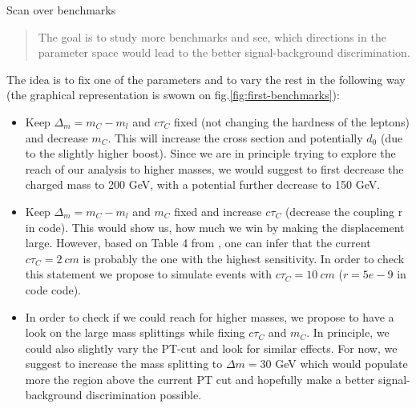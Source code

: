 \documentclass[12pt,letterpaper,notitlepage]{article}
\begin{document}
\begin{center}
\LARGE Scan over benchmarks
\end{center}

\vspace{1.0cm}
\begin{abstract}
\vspace{0.2cm}\noindent
The goal is to study more benchmarks and see, which directions in the parameter space would lead to the better signal-background discrimination.
\end{abstract}


The idea is to fix one of the parameters and to vary the rest in the following way (the graphical representation is swown on fig.\ref{fig:first-benchmarks}):
\begin{itemize}
  \item Keep $\Delta_m=m_C-m_l$ and $c \tau_C$ fixed (not changing the hardness of the leptons) and decrease $m_C$. This will increase the cross section and potentially $d_0$ (due to the slightly higher boost). Since we are in principle trying to explore the reach of our analysis to higher masses, we would suggest to first decrease the charged mass to 200 GeV, with a potential further decrease to 150 GeV.
  \item Keep $\Delta_m=m_C-m_l$ and $m_C$ fixed and increase  $c \tau_C$ (decrease the coupling r in code). This would show us, how much we win by making the displacement large. However, based on Table 4 from \cite{CMS:2016isf}, one can infer that the current $c \tau_C=2\ cm$ is probably the one with the highest sensitivity. In order to check this statement we propose to simulate events with $c \tau_C=10\ cm$ ($r=5e-9$ in code code).
  \item In order to check if we could reach for higher masses, we propose to have a look on the large mass splittings while fixing $c \tau_C$ and $m_C$. In principle, we could also slightly vary the PT-cut and look for similar effects. For now, we suggest to increase the mass splitting to $\Delta m=30$ GeV which would populate more the region above the current PT cut and hopefully make a better signal-background discrimination possible.
\end{itemize}
\end{document}
